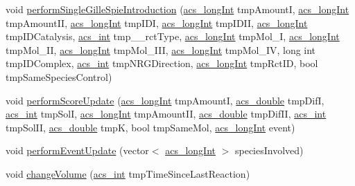 \begin{DoxyCompactItemize}
\item 
void \hyperlink{a00013_abb938b54a82473c0f6ba5eca607fca59}{perform\+Single\+Gille\+Spie\+Introduction} (\hyperlink{a00050_a19319d75f02db4308bc5c0026d98cd85}{acs\+\_\+long\+Int} tmp\+Amount\+I, \hyperlink{a00050_a19319d75f02db4308bc5c0026d98cd85}{acs\+\_\+long\+Int} tmp\+Amount\+I\+I, \hyperlink{a00050_a19319d75f02db4308bc5c0026d98cd85}{acs\+\_\+long\+Int} tmp\+I\+D\+I, \hyperlink{a00050_a19319d75f02db4308bc5c0026d98cd85}{acs\+\_\+long\+Int} tmp\+I\+D\+I\+I, \hyperlink{a00050_a19319d75f02db4308bc5c0026d98cd85}{acs\+\_\+long\+Int} tmp\+I\+D\+Catalysis, \hyperlink{a00050_a8d277355641a098190360234e2ebde35}{acs\+\_\+int} tmp\+\_\+\+\_\+rct\+Type, \hyperlink{a00050_a19319d75f02db4308bc5c0026d98cd85}{acs\+\_\+long\+Int} tmp\+Mol\+\_\+\+I, \hyperlink{a00050_a19319d75f02db4308bc5c0026d98cd85}{acs\+\_\+long\+Int} tmp\+Mol\+\_\+\+I\+I, \hyperlink{a00050_a19319d75f02db4308bc5c0026d98cd85}{acs\+\_\+long\+Int} tmp\+Mol\+\_\+\+I\+I\+I, \hyperlink{a00050_a19319d75f02db4308bc5c0026d98cd85}{acs\+\_\+long\+Int} tmp\+Mol\+\_\+\+I\+V, long int tmp\+I\+D\+Complex, \hyperlink{a00050_a8d277355641a098190360234e2ebde35}{acs\+\_\+int} tmp\+N\+R\+G\+Direction, \hyperlink{a00050_a19319d75f02db4308bc5c0026d98cd85}{acs\+\_\+long\+Int} tmp\+Rct\+I\+D, bool tmp\+Same\+Species\+Control)
\item 
void \hyperlink{a00013_ad25f6aa3ab2ac6097f57828bcf78e5c9}{perform\+Score\+Update} (\hyperlink{a00050_a19319d75f02db4308bc5c0026d98cd85}{acs\+\_\+long\+Int} tmp\+Amount\+I, \hyperlink{a00050_ab776853a005fcbf56af0424a2a4dd607}{acs\+\_\+double} tmp\+Dif\+I, \hyperlink{a00050_a8d277355641a098190360234e2ebde35}{acs\+\_\+int} tmp\+Sol\+I, \hyperlink{a00050_a19319d75f02db4308bc5c0026d98cd85}{acs\+\_\+long\+Int} tmp\+Amount\+I\+I, \hyperlink{a00050_ab776853a005fcbf56af0424a2a4dd607}{acs\+\_\+double} tmp\+Dif\+I\+I, \hyperlink{a00050_a8d277355641a098190360234e2ebde35}{acs\+\_\+int} tmp\+Sol\+I\+I, \hyperlink{a00050_ab776853a005fcbf56af0424a2a4dd607}{acs\+\_\+double} tmp\+K, bool tmp\+Same\+Mol, \hyperlink{a00050_a19319d75f02db4308bc5c0026d98cd85}{acs\+\_\+long\+Int} event)
\item 
void \hyperlink{a00013_ae7ef2ef3277e15e1644496e118ebb9bc}{perform\+Event\+Update} (vector$<$ \hyperlink{a00050_a19319d75f02db4308bc5c0026d98cd85}{acs\+\_\+long\+Int} $>$ species\+Involved)
\item 
void \hyperlink{a00013_a0156a2d7219396e58a930731966b0c66}{change\+Volume} (\hyperlink{a00050_a8d277355641a098190360234e2ebde35}{acs\+\_\+int} tmp\+Time\+Since\+Last\+Reaction)

\end{DoxyCompactItemize}
